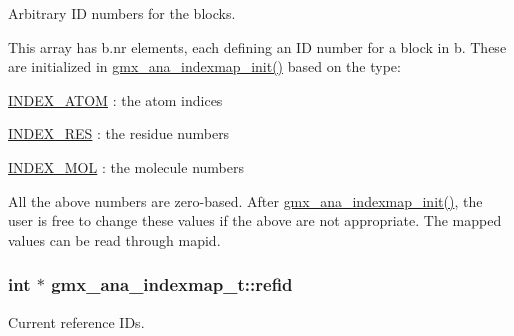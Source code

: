 \-Arbitrary \-I\-D numbers for the blocks. 

\-This array has {\ttfamily b.\-nr} elements, each defining an \-I\-D number for a block in {\ttfamily b}. \-These are initialized in \hyperlink{include_2indexutil_8h_a3230fa2b1cf35d0f9c654b6e34265c00}{gmx\-\_\-ana\-\_\-indexmap\-\_\-init()} based on the type\-:
\begin{DoxyItemize}
\item \hyperlink{share_2template_2gromacs_2indexutil_8h_ad7330829cb93245b9de7ed268cf6ba67a8270d36cd367d434ccd9fe0dc1b886d8}{\-I\-N\-D\-E\-X\-\_\-\-A\-T\-O\-M} \-: the atom indices
\item \hyperlink{share_2template_2gromacs_2indexutil_8h_ad7330829cb93245b9de7ed268cf6ba67a744bebc713caa98b8bf8b837af07834d}{\-I\-N\-D\-E\-X\-\_\-\-R\-E\-S} \-: the residue numbers
\item \hyperlink{share_2template_2gromacs_2indexutil_8h_ad7330829cb93245b9de7ed268cf6ba67ae082401c42a6fac46f6701a68f822c86}{\-I\-N\-D\-E\-X\-\_\-\-M\-O\-L} \-: the molecule numbers
\end{DoxyItemize}

\-All the above numbers are zero-\/based. \-After \hyperlink{include_2indexutil_8h_a3230fa2b1cf35d0f9c654b6e34265c00}{gmx\-\_\-ana\-\_\-indexmap\-\_\-init()}, the user is free to change these values if the above are not appropriate. \-The mapped values can be read through {\ttfamily mapid}. \hypertarget{structgmx__ana__indexmap__t_a48e42d65b5d5df29d1a3ed8c2264be77}{
\subsubsection[{refid}]{\setlength{\rightskip}{0pt plus 5cm}int $\ast$ {\bf gmx\-\_\-ana\-\_\-indexmap\-\_\-t\-::refid}}}\label{structgmx__ana__indexmap__t_a48e42d65b5d5df29d1a3ed8c2264be77}


\-Current reference \-I\-Ds. 

